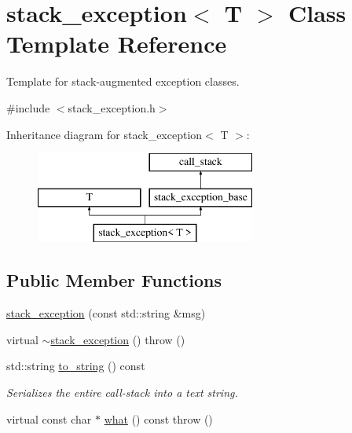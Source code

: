 \hypertarget{classstacktrace_1_1stack__exception}{}\section{stack\+\_\+exception$<$ T $>$ Class Template Reference}
\label{classstacktrace_1_1stack__exception}


Template for stack-\/augmented exception classes.  




{\ttfamily \#include $<$stack\+\_\+exception.\+h$>$}

Inheritance diagram for stack\+\_\+exception$<$ T $>$\+:\begin{figure}[H]
\begin{center}
\leavevmode
\includegraphics[height=3.000000cm]{classstacktrace_1_1stack__exception}
\end{center}
\end{figure}
\subsection*{Public Member Functions}
\begin{DoxyCompactItemize}
\item 
\mbox{\hyperlink{classstacktrace_1_1stack__exception_abc5d5c322d59858f2736eddc4ec6d6f5}{stack\+\_\+exception}} (const std\+::string \&msg)
\item 
virtual \mbox{\hyperlink{classstacktrace_1_1stack__exception_a57db85df4f7cf23a56639c8d21cde00c}{$\sim$stack\+\_\+exception}} ()  throw ()
\item 
std\+::string \mbox{\hyperlink{classstacktrace_1_1call__stack_aac993ecccd3d88aafefb6b8e3caa1dee}{to\+\_\+string}} () const
\begin{DoxyCompactList}\small\item\em Serializes the entire call-\/stack into a text string. \end{DoxyCompactList}\item 
virtual const char $\ast$ \mbox{\hyperlink{classstacktrace_1_1stack__exception_ad62489809e3df568e973597b928d6d9b}{what}} () const  throw ()
\end{DoxyCompactItemize}
